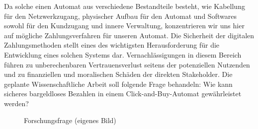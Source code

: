 Da solche einen Automat aus verschiedene Bestandteile besteht, wie Kabellung für den Netzwerkzugang,
physischer Aufbau für den Automat und Softwares sowohl für den Kundzugang und innere Verwaltung,
konzentrieren wir uns hier auf mögliche Zahlungsverfahren für unseren Automat. Die Sicherheit der digitalen 
Zahlungsmethoden stellt eines des wichtigsten Herausforderung für die Entwicklung eines solchen Systems dar. 
Vernachlässigungen in diesem Bereich führen zu unberechenbaren Vertrauensverlust seitens der potenziellen 
Nutzenden und zu finanziellen und moralischen Schäden der direkten Stakeholder. Die geplante 
Wissenschaftliche Arbeit soll folgende Frage behandeln: Wie kann sicheres bargeldloses Bezahlen 
in einem Click-and-Buy-Automat gewährleistet werden? 

\vspace*{1cm}
\begin{figure}[H]
    \caption{Forschungsfrage (eigenes Bild)}
    \label{fig:diagramrecherche}
\end{figure}
